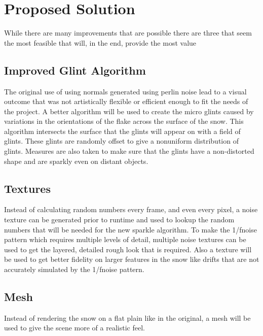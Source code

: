 \documentclass{IEEEtran}
\begin{document}
\section{Proposed Solution}

While there are many improvements that are possible there are three that seem
the most feasible that will, in the end, provide the most value

\subsection{Improved Glint Algorithm}

The original use of using normals generated using perlin noise lead to a visual
outcome that was not artistically flexible or efficient enough to fit the needs of the
project. A better algorithm \cite{sparkle} will be used to
create the micro glints caused by variations in the orientations of the flake
across the surface of the snow. This algorithm intersects the surface that the
glints will appear on with a field of glints. These glints are randomly offset
to give a nonuniform distribution of glints. Measures are also taken to make
sure that the glints have a non-distorted shape and are sparkly even on distant
objects.

\subsection{Textures}

Instead of calculating random numbers every frame, and even every pixel, a noise
texture can be generated prior to runtime and used to lookup the random numbers
that will be needed for the new sparkle algorithm. To make the 1/fnoise
pattern which requires multiple levels of detail, multiple noise textures can be
used to get the layered, detailed rough look that is required. Also a texture
will be used to get better fidelity on larger features in the snow like drifts that
are not accurately simulated by the 1/fnoise pattern.

\subsection{Mesh}

Instead of rendering the snow on a flat plain like in the original, a mesh will
be used to give the scene more of a realistic feel.



\end{document}
